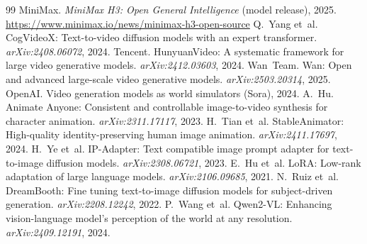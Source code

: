 \documentclass{article}
\begin{document}
\begin{thebibliography}{99}
 MiniMax.
\newblock \emph{MiniMax H3: Open General Intelligence} (model release), 2025.
\newblock \url{https://www.minimax.io/news/minimax-h3-open-source}
 Q.~Yang et~al.
\newblock CogVideoX: Text-to-video diffusion models with an expert transformer.
\newblock \emph{arXiv:2408.06072}, 2024.
 Tencent.
\newblock HunyuanVideo: A systematic framework for large video generative models.
\newblock \emph{arXiv:2412.03603}, 2024.
 Wan~Team.
\newblock Wan: Open and advanced large-scale video generative models.
\newblock \emph{arXiv:2503.20314}, 2025.
 OpenAI.
\newblock Video generation models as world simulators (Sora), 2024.
 A.~Hu.
\newblock Animate Anyone: Consistent and controllable image-to-video synthesis for character
animation. \emph{arXiv:2311.17117}, 2023.
 H.~Tian et~al.
\newblock StableAnimator: High-quality identity-preserving human image animation.
\newblock \emph{arXiv:2411.17697}, 2024.
 H.~Ye et~al.
\newblock IP-Adapter: Text compatible image prompt adapter for text-to-image diffusion models.
\newblock \emph{arXiv:2308.06721}, 2023.
 E.~Hu et~al.
\newblock LoRA: Low-rank adaptation of large language models.
\newblock \emph{arXiv:2106.09685}, 2021.
 N.~Ruiz et~al.
\newblock DreamBooth: Fine tuning text-to-image diffusion models for subject-driven generation.
\newblock \emph{arXiv:2208.12242}, 2022.
 P.~Wang et~al.
\newblock Qwen2-VL: Enhancing vision-language model's perception of the world at any resolution.
\newblock \emph{arXiv:2409.12191}, 2024.
\end{thebibliography}
\end{document}
